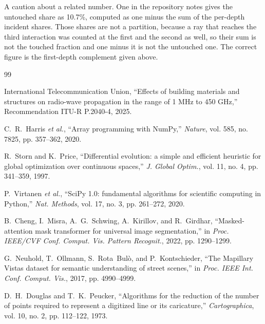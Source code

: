 \documentclass[journal]{IEEEtran}
\begin{document}
A caution about a related number. One in the repository notes gives the
untouched share as 10.7\%, computed as one minus the sum of the per-depth
incident shares. Those shares are not a partition, because a ray that reaches
the third interaction was counted at the first and the second as well, so their
sum is not the touched fraction and one minus it is not the untouched one. The
correct figure is the first-depth complement given above.

\begin{thebibliography}{99}

International Telecommunication Union, ``Effects of building materials and
structures on radio-wave propagation in the range of 1 MHz to 450 GHz,''
Recommendation ITU-R P.2040-4, 2025.

C.~R.~Harris \emph{et al.}, ``Array programming with NumPy,'' \emph{Nature},
vol. 585, no. 7825, pp. 357--362, 2020.


R.~Storn and K.~Price, ``Differential evolution: a simple and efficient
heuristic for global optimization over continuous spaces,'' \emph{J. Global
Optim.}, vol. 11, no. 4, pp. 341--359, 1997.

P.~Virtanen \emph{et al.}, ``SciPy 1.0: fundamental algorithms for scientific
computing in Python,'' \emph{Nat. Methods}, vol. 17, no. 3, pp. 261--272, 2020.

B.~Cheng, I.~Misra, A.~G.~Schwing, A.~Kirillov, and R.~Girdhar,
``Masked-attention mask transformer for universal image segmentation,'' in
\emph{Proc. IEEE/CVF Conf. Comput. Vis. Pattern Recognit.}, 2022,
pp. 1290--1299.

G.~Neuhold, T.~Ollmann, S.~Rota~Bul\`o, and P.~Kontschieder, ``The Mapillary
Vistas dataset for semantic understanding of street scenes,'' in \emph{Proc.
IEEE Int. Conf. Comput. Vis.}, 2017, pp. 4990--4999.

D.~H.~Douglas and T.~K.~Peucker, ``Algorithms for the reduction of the number of
points required to represent a digitized line or its caricature,''
\emph{Cartographica}, vol. 10, no. 2, pp. 112--122, 1973.

\end{thebibliography}
\end{document}

